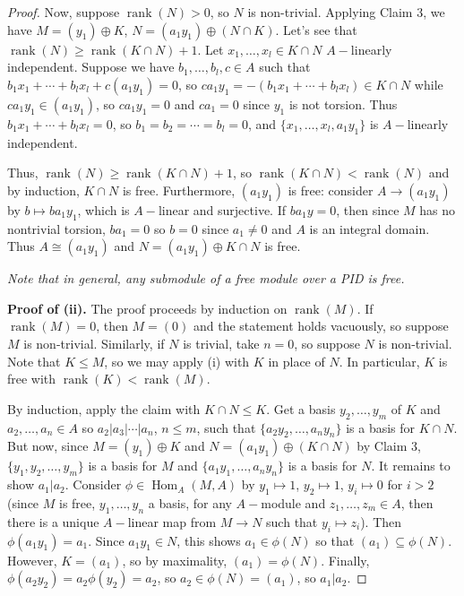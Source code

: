 \documentclass[11pt, a4paper]{memoir}
\theoremstyle{change}
\theoremstyle{plain}
\theoremstyle{nonumberplain}
\newtheorem{proof}{Proof}
\DeclareMathOperator{\Hom}{Hom}
\DeclareMathOperator{\rank}{rank}
\numberwithin{equation}{section}
\begin{document}
\begin{proof}
    Now, suppose $\rank(N)>0$, so $N$ is non-trivial.
    Applying Claim 3, we have $M=(y_1)\oplus K$, $N=(a_1y_1)\oplus(N\cap K)$.
    Let's see that $\rank(N)\geq\rank(K\cap N)+1$.
    Let $x_1,\ldots,x_l\in K\cap N$ $A-$linearly independent.
    Suppose we have $b_1,\ldots,b_l,c\in A$ such that $b_1x_1+\cdots+b_lx_l+c(a_1y_1)=0$, so $ca_1y_1=-(b_1x_1+\cdots+b_lx_l)\in K\cap N$ while $ca_1y_1\in (a_1y_1)$, so $ca_1y_1=0$ and $ca_1=0$ since $y_1$ is not torsion.
    Thus $b_1x_1+\cdots+b_lx_l=0$, so $b_1=b_2=\cdots=b_l=0$, and $\{x_1,\ldots,x_l,a_1y_1\}$ is $A-$linearly independent.
    
    Thus, $\rank(N)\geq\rank(K\cap N)+1$, so $\rank(K\cap N)<\rank(N)$ and by induction, $K\cap N$ is free.
    Furthermore, $(a_1y_1)$ is free: consider $A\to(a_1y_1)$ by $b\mapsto ba_1y_1$, which is $A-$linear and surjective.
    If $ba_1y=0$, then since $M$ has no nontrivial torsion, $ba_1=0$ so $b=0$ since $a_1\neq 0$ and $A$ is an integral domain.
    Thus $A\cong(a_1y_1)$ and $N=(a_1y_1)\oplus K\cap N$ is free.

    \textit{Note that in general, any submodule of a free module over a PID is free.}

    \textbf{Proof of (ii).}
    The proof proceeds by induction on $\rank(M)$.
    If $\rank(M)=0$, then $M=(0)$ and the statement holds vacuously, so suppose $M$ is non-trivial.
    Similarly, if $N$ is trivial, take $n=0$, so suppose $N$ is non-trivial.
    Note that $K\leq M$, so we may apply (i) with $K$ in place of $N$.
    In particular, $K$ is free with $\rank(K)<\rank(M)$.

    By induction, apply the claim with $K\cap N\leq K$.
    Get a basis $y_2,\ldots,y_m$ of $K$ and $a_2,\ldots,a_n\in A$ so $a_2|a_3|\cdots|a_n$, $n\leq m$, such that $\{a_2y_2,\ldots,a_ny_n\}$ is a basis for $K\cap N$.
    But now, since $M=(y_1)\oplus K$ and $N=(a_1y_1)\oplus(K\cap N)$ by Claim 3, $\{y_1,y_2,\ldots,y_m\}$ is a basis for $M$ and $\{a_1y_1,\ldots,a_ny_n\}$ is a basis for $N$.
    It remains to show $a_1|a_2$.
    Consider $\phi\in\Hom_A(M,A)$ by $y_1\mapsto 1$, $y_2\mapsto 1$, $y_i\mapsto 0$ for $i>2$ (since $M$ is free, $y_1,\ldots,y_n$ a basis, for any $A-$module and $z_1,\ldots,z_m\in A$, then there is a unique $A-$linear map from $M\to N$ such that $y_i\mapsto z_i$).
    Then $\phi(a_1y_1)=a_1$.
    Since $a_1y_1\in N$, this shows $a_1\in\phi(N)$ so that $(a_1)\subseteq\phi(N)$.
    However, $K=(a_1)$, so by maximality, $(a_1)=\phi(N)$.
    Finally, $\phi(a_2y_2)=a_2\phi(y_2)=a_2$, so $a_2\in\phi(N)=(a_1)$, so $a_1|a_2$.
\end{proof}
\end{document}
